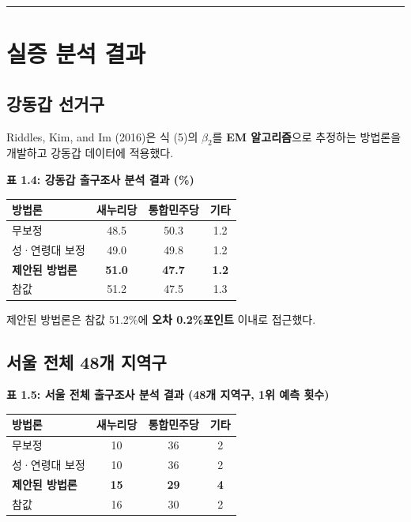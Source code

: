 \documentclass[
  letterpaper,
  DIV=11,
  numbers=noendperiod]{scrreprt}
\newcounter{none} %
\begin{document}
\begin{center}\rule{0.5\linewidth}{0.5pt}\end{center}

\section{실증 분석 결과}\label{uxc2e4uxc99d-uxbd84uxc11d-uxacb0uxacfc}

\subsection{강동갑 선거구}\label{uxac15uxb3d9uxac11-uxc120uxac70uxad6c}

Riddles, Kim, and Im (2016)은 식 (5)의 \(\beta_2\)를 \textbf{EM
알고리즘}으로 추정하는 방법론을 개발하고 강동갑 데이터에 적용했다.

\textbf{표 1.4: 강동갑 출구조사 분석 결과 (\%)}

{\def\LTcaptype{none} %
\begin{longtable}[]{@{}lccc@{}}
\toprule\noalign{}
방법론 & 새누리당 & 통합민주당 & 기타 \\
\midrule\noalign{}
\endhead
\bottomrule\noalign{}
\endlastfoot
무보정 & 48.5 & 50.3 & 1.2 \\
성·연령대 보정 & 49.0 & 49.8 & 1.2 \\
\textbf{제안된 방법론} & \textbf{51.0} & \textbf{47.7} & \textbf{1.2} \\
참값 & 51.2 & 47.5 & 1.3 \\
\end{longtable}
}

제안된 방법론은 참값 51.2\%에 \textbf{오차 0.2\%포인트} 이내로 접근했다.

\subsection{서울 전체 48개
지역구}\label{uxc11cuxc6b8-uxc804uxccb4-48uxac1c-uxc9c0uxc5eduxad6c}

\textbf{표 1.5: 서울 전체 출구조사 분석 결과 (48개 지역구, 1위 예측
횟수)}

{\def\LTcaptype{none} %
\begin{longtable}[]{@{}lccc@{}}
\toprule\noalign{}
방법론 & 새누리당 & 통합민주당 & 기타 \\
\midrule\noalign{}
\endhead
\bottomrule\noalign{}
\endlastfoot
무보정 & 10 & 36 & 2 \\
성·연령대 보정 & 10 & 36 & 2 \\
\textbf{제안된 방법론} & \textbf{15} & \textbf{29} & \textbf{4} \\
참값 & 16 & 30 & 2 \\
\end{longtable}
}
\end{document}
